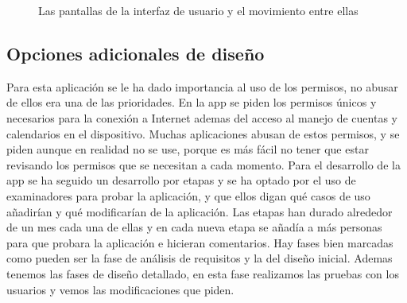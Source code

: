 \begin{figure}[H]
  \caption{Las pantallas de la interfaz de usuario y el movimiento entre ellas}
  \label{fig:activity-relations}
\end{figure}

\subsection{Opciones adicionales de diseño}
\label{subsecc:Opciones adicionales de diseño}

Para esta aplicación se le ha dado importancia al uso de los permisos, no abusar de ellos era una de las prioridades.
En la app se piden los permisos únicos y necesarios para la conexión a Internet ademas del acceso al manejo de cuentas y calendarios en el dispositivo.
Muchas aplicaciones abusan de estos permisos, y se piden aunque en realidad no se use, porque es más fácil no tener que estar revisando los permisos que se necesitan a cada momento.
Para el desarrollo de la app se ha seguido un desarrollo por etapas y se ha optado por el uso de examinadores para probar la aplicación, y que ellos digan qué casos de uso añadirían y qué modificarían de la aplicación.
Las etapas han durado alrededor de un mes cada una de ellas y en cada nueva etapa se añadía a más personas para que probara la aplicación e hicieran comentarios.
Hay fases bien marcadas como pueden ser la fase de análisis de requisitos y la del diseño inicial. Ademas tenemos las fases de diseño detallado, en esta fase realizamos las pruebas con los usuarios y vemos las modificaciones que piden.


